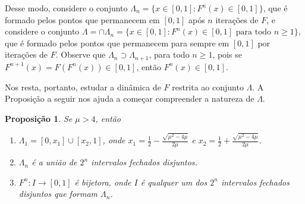 \documentclass[a4paper, 12pt]{article}
\theoremstyle{definition}
\theoremstyle{plain}
\newtheorem{proposition}[definition]{Proposição}
\theoremstyle{plain}
\theoremstyle{plain}
\theoremstyle{definition}
\theoremstyle{remark}
\begin{document}
Desse modo, considere o conjunto $\Lambda_n = \{x \in [0, 1] : F^n(x) \in [0, 1]\}$, que é formado pelos pontos que permanecem em $[0, 1]$ após $n$ iterações de $F$, e considere o conjunto $\Lambda = \cap \Lambda_n = \{x \in [0, 1] : F^n(x) \in [0, 1] \textrm{ para todo } n \geq 1\}$, que é formado pelos pontos que permanecem para sempre em $[0, 1]$ por iterações de $F$. Observe que $\Lambda_n \supset \Lambda_{n+1}$, para todo $n \geq 1$, pois se $F^{n+1}(x) = F(F^n(x)) \in [0,1]$, então $F^n(x) \in [0,1]$.

Nos resta, portanto, estudar a dinâmica de $F$ restrita ao conjunto $\Lambda$. A Proposição a seguir nos ajuda a começar compreender a natureza de $\Lambda$.

\begin{proposition}
\label{proposition 4 1}
Se $\mu > 4$, então
\begin{enumerate}
\item $\Lambda_1 = [0, x_1] \cup [x_2, 1]$, onde $x_1 = \frac{1}{2} - \frac{\sqrt{\mu^2 - 4\mu}}{2\mu}$ e $x_2 = \frac{1}{2} + \frac{\sqrt{\mu^2 - 4\mu}}{2\mu}$.
\item $\Lambda_n$ é a união de $2^n$ intervalos fechados disjuntos.
\item $F^n: I \to [0, 1]$ é bijetora, onde $I$ é qualquer um dos $2^n$ intervalos fechados disjuntos que formam $\Lambda_n$.
\end{enumerate}
\end{proposition}
\end{document}
